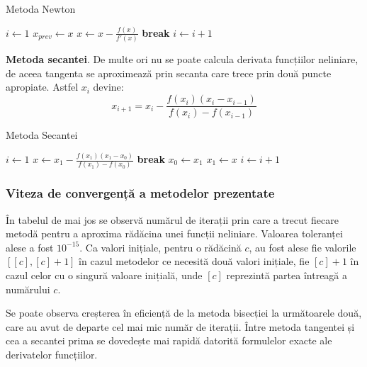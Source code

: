 \documentclass{exam}
\begin{document}
\newpage
\begin{algorithm}
	\caption{Metoda Newton}
	\begin{algorithmic}[1]
		\State $i \gets 1$
		\State $x_{prev} \gets x$
		\State $x \gets x - \frac{f(x)}{f'(x)}$
		\State \textbf{break}
		\EndIf
		\State $i \gets i + 1$
		\EndWhile
	\end{algorithmic}
\end{algorithm}

\textbf{Metoda secantei}. De multe ori nu se poate calcula derivata funcțiilor
neliniare, de aceea tangenta se aproximează prin secanta care trece prin două
puncte apropiate. Astfel $x_i$ devine:
\begin{equation*}
	x_{i+1}=x_i - \frac{f(x_i)(x_i - x_{i - 1})}{f(x_i)-f(x_{i - 1})}
\end{equation*}

\begin{algorithm}
	\caption{Metoda Secantei}
	\begin{algorithmic}[1]
		\State $i \gets 1$
		\State $x \gets x_1 - \frac{f(x_1)(x_1 - x_0)}{f(x_1) - f(x_0)}$
		\State \textbf{break}
		\EndIf
		\State $x_0 \gets x_1$
		\State $x_1 \gets x$
		\State $i \gets i + 1$
		\EndWhile
	\end{algorithmic}
\end{algorithm}

\subsubsection{Viteza de convergență a metodelor prezentate}

În tabelul de mai jos se observă numărul de iterații prin care a trecut fiecare
metodă pentru a aproxima rădăcina unei funcții neliniare. Valoarea toleranței
alese a fost $10^{-15}$. Ca valori inițiale, pentru o rădăcină $c$, au fost
alese fie valorile $[[c], [c] + 1]$ în cazul metodelor ce necesită două valori
inițiale, fie $[c] + 1$ în cazul celor cu o singură valoare inițială, unde
$[c]$ reprezintă partea întreagă a numărului $c$.

Se poate observa creșterea în eficiență de la metoda bisecției la următoarele
două, care au avut de departe cel mai mic număr de iterații. Între metoda
tangentei și cea a secantei prima se dovedește mai rapidă datorită formulelor
exacte ale derivatelor funcțiilor.
\end{document}
